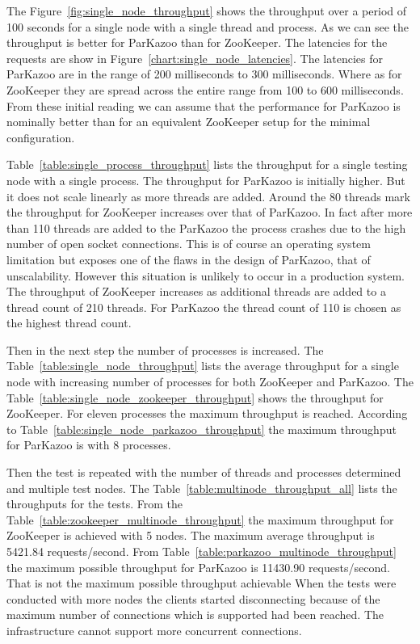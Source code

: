 



The Figure~\ref{fig:single_node_throughput} shows the throughput over a period of 100 seconds for a single node with a single thread and process. As we can see the throughput is better for ParKazoo than for ZooKeeper. The latencies for the requests are show in Figure~\ref{chart:single_node_latencies}. The latencies for ParKazoo are in the range of 200 milliseconds to 300 milliseconds. Where as for ZooKeeper they are spread across the entire range from 100 to 600 milliseconds. From these initial reading we can assume that the performance for ParKazoo is nominally better than for an equivalent ZooKeeper setup for the minimal configuration.



Table~\ref{table:single_process_throughput} lists the throughput for a single testing node with a single process. The throughput for ParKazoo is initially higher. But it does not scale linearly as more threads are added. Around the 80 threads mark the throughput for ZooKeeper increases over that of ParKazoo. In fact after more than 110 threads are added to the ParKazoo the process crashes due to the high number of open socket connections. This is of course an operating system limitation but exposes one of the flaws in the design of ParKazoo, that of unscalability. However this situation is unlikely to occur in a production system. The throughput of ZooKeeper increases as additional threads are added to a thread count of 210 threads. For ParKazoo the thread count of 110 is chosen as the highest thread count.



Then in the next step the number of processes is increased. The Table~\ref{table:single_node_throughput} lists the average throughput for a single node with increasing number of processes for both ZooKeeper and ParKazoo. The Table~\ref{table:single_node_zookeeper_throughput} shows the throughput for ZooKeeper. For eleven processes the maximum throughput is reached. According to Table~\ref{table:single_node_parkazoo_throughput} the maximum throughput for ParKazoo is with 8 processes.

Then the test is repeated with the number of threads and processes determined and multiple test nodes. The Table~\ref{table:multinode_throughput_all} lists the throughputs for the tests. From the Table~\ref{table:zookeeper_multinode_throughput} the maximum throughput for ZooKeeper is achieved with 5 nodes. The maximum average throughput is 5421.84 requests/second. From Table~\ref{table:parkazoo_multinode_throughput} the maximum possible throughput for ParKazoo is 11430.90 requests/second. That is not the maximum possible throughput achievable When the tests were conducted with more nodes the clients started disconnecting because of the maximum number of connections which is supported had been reached. The infrastructure cannot support more concurrent connections.


